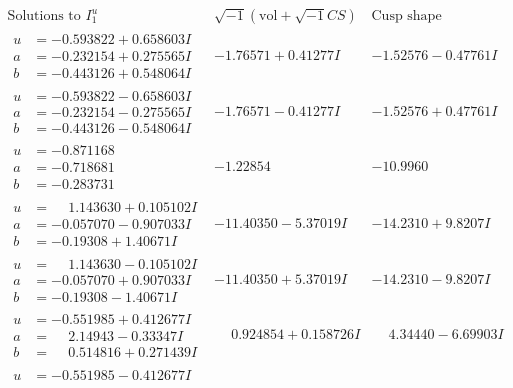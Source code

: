 \documentclass[1p]{elsarticle_modified}
\theoremstyle{definition}
\newcommand{\I}{\sqrt{-1}}
\begin{document}
$$\begin{array}{c|c|c}  
\text{Solutions to }I^u_{1}& \I (\text{vol} + \sqrt{-1}CS) & \text{Cusp shape}\\
 \hline 
\begin{aligned}
u &= -0.593822 + 0.658603 I \\
a &= -0.232154 + 0.275565 I \\
b &= -0.443126 + 0.548064 I\end{aligned}
 & -1.76571 + 0.41277 I & -1.52576 - 0.47761 I \\ \hline\begin{aligned}
u &= -0.593822 - 0.658603 I \\
a &= -0.232154 - 0.275565 I \\
b &= -0.443126 - 0.548064 I\end{aligned}
 & -1.76571 - 0.41277 I & -1.52576 + 0.47761 I \\ \hline\begin{aligned}
u &= -0.871168\phantom{ +0.000000I} \\
a &= -0.718681\phantom{ +0.000000I} \\
b &= -0.283731\phantom{ +0.000000I}\end{aligned}
 & -1.22854\phantom{ +0.000000I} & -10.9960\phantom{ +0.000000I} \\ \hline\begin{aligned}
u &= \phantom{-}1.143630 + 0.105102 I \\
a &= -0.057070 - 0.907033 I \\
b &= -0.19308 + 1.40671 I\end{aligned}
 & -11.40350 - 5.37019 I & -14.2310 + 9.8207 I \\ \hline\begin{aligned}
u &= \phantom{-}1.143630 - 0.105102 I \\
a &= -0.057070 + 0.907033 I \\
b &= -0.19308 - 1.40671 I\end{aligned}
 & -11.40350 + 5.37019 I & -14.2310 - 9.8207 I \\ \hline\begin{aligned}
u &= -0.551985 + 0.412677 I \\
a &= \phantom{-}2.14943 - 0.33347 I \\
b &= \phantom{-}0.514816 + 0.271439 I\end{aligned}
 & \phantom{-}0.924854 + 0.158726 I & \phantom{-}4.34440 - 6.69903 I \\ \hline\begin{aligned}
u &= -0.551985 - 0.412677 I \\

\end{aligned}
\end{array}$$
\end{document}
